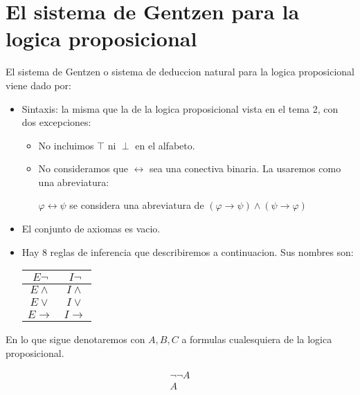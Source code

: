 \section{El sistema de Gentzen para la logica proposicional}
\begin{definition}
	El sistema de Gentzen o sistema de deduccion natural para la logica proposicional viene dado por:
	\begin{itemize}
		\item Sintaxis: la misma que la de la logica proposicional vista en el tema 2, con dos excepciones: \begin{itemize}
			      \item No incluimos \(\top \) ni \(\perp \) en el alfabeto.
			      \item No consideramos que \(\leftrightarrow \) sea una conectiva binaria. La usaremos como una abreviatura:

			            \(\varphi \leftrightarrow \psi \) se considera una abreviatura de \((\varphi \rightarrow \psi ) \wedge (\psi \rightarrow \varphi)\)
		      \end{itemize}
		\item El conjunto de axiomas es vacio.
		\item Hay 8 reglas de inferencia que describiremos a continuacion. Sus nombres son:
		      \begin{table}[H]
			      \centering
			      \begin{tabular}{|c|c|}
				      \hline
				      \(E\neg \)         & \(I\neg \)         \\ \hline
				      \(E \wedge  \)     & \(I \wedge \)      \\ \hline
				      \(E \vee  \)       & \(I \vee  \)       \\ \hline
				      \(E \rightarrow \) & \(I \rightarrow \) \\
				      \hline
			      \end{tabular}
			      \label{tab:label}
		      \end{table}
	\end{itemize}
\end{definition}

En lo que sigue denotaremos con \(A,B,C \) a formulas cualesquiera de la logica proposicional.

\begin{definition}
	\[
		\begin{array}{c}
			\neg \neg A \\
			\hline
			A
		\end{array}
	\]
\end{definition}

